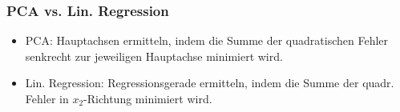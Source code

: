 
%
%
%








\begin{frame}

\frametitle{PCA vs. Lin. Regression}

\begin{itemize}
\item PCA: Hauptachsen ermitteln, indem die Summe der quadratischen Fehler senkrecht zur jeweiligen Hauptachse minimiert wird.
\item Lin. Regression: Regressionsgerade ermitteln, indem die Summe der quadr. Fehler in $x_2$-Richtung minimiert wird.
\end{itemize}

\begin{figure}[h]
\centering
{}%
\qquad
{}%
\end{figure}

\end{frame}







